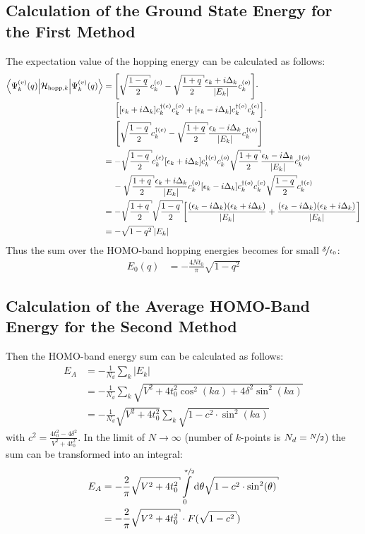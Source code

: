 \subsection{Calculation of the Ground State Energy for the First Method}
The expectation value of the hopping energy can be calculated as follows:
\begin{align}
\left\langle\Psi_k^{(v)}(q)\Big|\mathcal{H}_{\text{hopp},k}\Big|\Psi_k^{(v)}(q)\right\rangle &= \left[\sqrt{\frac{1-q}{2}}c_k^{(e)}- \sqrt{\frac{1+q}{2}}\frac{\epsilon_k + i \Delta_k}{|E_k|}c_{k}^{(o)}\right]\cdot\nonumber\\
&\hspace*{0.5cm}\left[
\left[\epsilon_k + i\Delta_k\right]c_{k}^{\dagger(e)}c_{k}^{(o)} + \left[\epsilon_k-i\Delta_k \right]	c_{k}^{\dagger(o)}c_{k}^{(e)}
\right]\cdot\nonumber\\
&\hspace*{0.5cm}\left[\sqrt{\frac{1-q}{2}}c_k^{\dagger(e)}- \sqrt{\frac{1+q}{2}}\frac{\epsilon_k - i \Delta_k}{|E_k|}c_{k}^{\dagger(o)}\right]\\
&=-\sqrt{\frac{1-q}{2}}c_k^{(e)}\left[\epsilon_k+i\Delta_k \right]	c_{k}^{\dagger(e)}c_{k}^{(o)}\sqrt{\frac{1+q}{2}}\frac{\epsilon_k - i \Delta_k}{|E_k|}c_{k}^{\dagger(o)}\nonumber\\
&\hspace*{0.4cm}-\sqrt{\frac{1+q}{2}}\frac{\epsilon_k + i \Delta_k}{|E_k|}c_{k}^{(o)}\left[\epsilon_k - i\Delta_k\right]c_{k}^{\dagger(o)}c_{k}^{(e)}\sqrt{\frac{1-q}{2}}c_k^{\dagger(e)}\\
&=-\sqrt{\frac{1+q}{2}}\sqrt{\frac{1-q}{2}}\left[\frac{(\epsilon_k-i\Delta_k)(\epsilon_k+i\Delta_k)}{|E_k|}+\frac{(\epsilon_k-i\Delta_k)(\epsilon_k+i\Delta_k)}{|E_k|}\right]\\
&= -\sqrt{1-q^2} |E_k|
\end{align}
Thus the sum over the HOMO-band hopping energies becomes for small $\nicefrac{\delta}{t_0}$:
\begin{align}
E_0(q) &= -\frac{4Nt_0}{\pi} \sqrt{1-q^2}
\end{align}
\subsection{Calculation of the Average HOMO-Band Energy for the Second Method}
Then the HOMO-band energy sum can be calculated as follows:
\begin{align}
E_A &= -\frac{1}{N_d}\sum_k |E_k|\\
&= -\frac{1}{N_d}\sum_k \sqrt{V^2 + 4t_0^2\cos^2(ka) + 4 \delta^2\sin^2(ka)}\\
&= -\frac{1}{N_d}\sqrt{V^2 + 4t_0^2}\sum_k \sqrt{1 - c^2 \cdot \sin^2(ka)}
\end{align} 
with $c^2 = \frac{4t_0^2-4\delta^2}{V^2+4t_0^2}$. In the limit of $N \to \infty$ (number of $k$-points is $N_d = \nicefrac{N}{2}$) the sum can be transformed into an integral:
\begin{align}
E_A &= -\frac{2}{\pi} \sqrt{V^2+4t_0^2} \int\limits_{0}^{\nicefrac{\pi}{2}} \text{d}\theta \sqrt{1 - c^2 \cdot \sin^2(\theta)}\\
&= -\frac{2}{\pi} \sqrt{V^2+4t_0^2} \cdot F(\sqrt{1-c^2}) 
\end{align}

